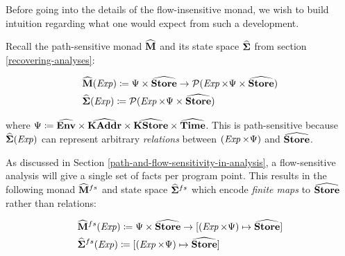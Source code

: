 \par

Before going into the details of the flow-insensitive monad, we wish to
build intuition regarding what one would expect from such a development.

\par

Recall the path-sensitive monad $ \widehat{\mathtt{\mathbf{M}}} $ and its state space
$ \widehat{\mathtt{\mathbf{\Sigma}}} $ from section \ref{recovering-analyses}:

\small\begin{align*}
&\hspace{0em}  \widehat{\mathtt{\mathbf{M}}}(  \operatorname{\mathit{Exp}})   \coloneqq   \Psi   \times   \widehat{\mathtt{\mathbf{Store}}}   \rightarrow   \mathcal{P}  (\operatorname{\mathit{Exp}}   \times   \Psi   \times   \widehat{\mathtt{\mathbf{Store}}})  \\
&\hspace{0em}  \widehat{\mathtt{\mathbf{\Sigma}}}  (\operatorname{\mathit{Exp}})   \coloneqq   \mathcal{P}  (\operatorname{\mathit{Exp}}   \times   \Psi   \times   \widehat{\mathtt{\mathbf{Store}}}) 
\end{align*}\normalsize

where
$ \Psi   \coloneqq   \widehat{\mathtt{\mathbf{Env}}}   \times   \widehat{\mathtt{\mathbf{KAddr}}}   \times   \widehat{\mathtt{\mathbf{KStore}}}   \times   \widehat{\mathtt{\mathbf{Time}}} $.
This is path-sensitive because $ \widehat{\mathtt{\mathbf{\Sigma}}}  (\operatorname{\mathit{Exp}}) $ can
represent arbitrary \emph{relations} between
$ (\operatorname{\mathit{Exp}}   \times   \Psi )$ and $ \widehat{\mathtt{\mathbf{Store}}} $.

\par

As discussed in Section \ref{path-and-flow-sensitivity-in-analysis}, a
flow-sensitive analysis will give a single set of facts per program
point. This results in the following monad $ \widehat{\mathtt{\mathbf{M}}} ^{  fs } $
and state space $ \widehat{\mathtt{\mathbf{\Sigma}}}  ^{ fs } $ which encode \emph{finite
maps} to $ \widehat{\mathtt{\mathbf{Store}}} $ rather than relations:

\small\begin{align*}
&\hspace{0em}  \widehat{\mathtt{\mathbf{M}}} ^{  fs }  (\operatorname{\mathit{Exp}})   \coloneqq   \Psi   \times   \widehat{\mathtt{\mathbf{Store}}}   \rightarrow   \lbrack  (\operatorname{\mathit{Exp}}   \times   \Psi )  \mapsto   \widehat{\mathtt{\mathbf{Store}}} \rbrack   \\
&\hspace{0em}  \widehat{\mathtt{\mathbf{\Sigma}}}  ^{ fs }  (\operatorname{\mathit{Exp}})   \coloneqq   \lbrack  (\operatorname{\mathit{Exp}}   \times   \Psi )  \mapsto   \widehat{\mathtt{\mathbf{Store}}} \rbrack  
\end{align*}\normalsize

